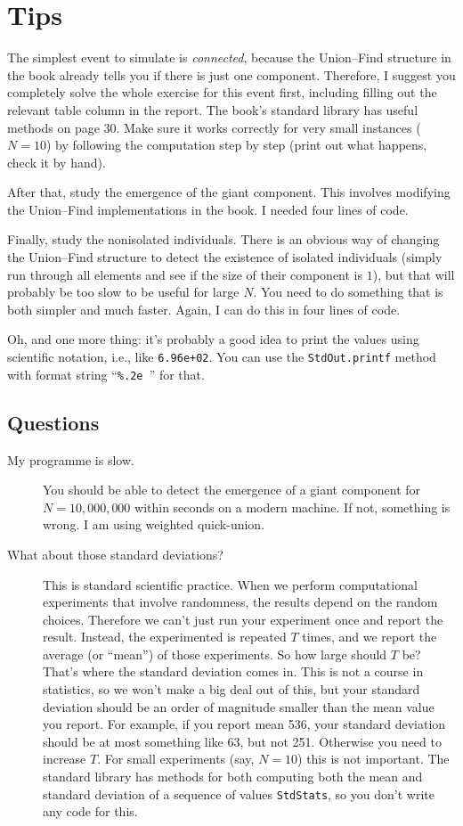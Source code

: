 \documentclass{tufte-handout}
\begin{document}
\section{Tips}

The simplest event to simulate is \emph{connected}, because
the Union--Find structure in the book already tells you if there is
just one component.
Therefore, I suggest you completely solve the whole exercise for this
event first, including filling out the relevant table column in the report.
The book's standard library has useful methods on page 30.
Make sure it works correctly for very small instances ($N=10$) by
following the computation step by step (print out what happens, check
it by hand).

After that, study the emergence of the giant component.
This involves modifying the Union--Find implementations in the book.
I needed four lines of code.

Finally, study the nonisolated individuals.
There is an obvious way of changing the Union--Find structure to detect
the existence of isolated individuals (simply run through all elements
and see if the size of their component is $1$), but that will probably
be too slow to be useful for large $N$.
You need to do something that is both simpler and much faster.
Again, I can do this in four lines of code.

Oh, and one more thing: it's probably a good idea to print the values
using scientific notation, i.e., like {\tt 6.96e+02}.
You can use the {\tt StdOut.printf} method with format string
``{\tt \%.2e }''  for that.

\subsection{Questions}
\begin{description}
\item[My programme is slow.] You should be able to detect the emergence
  of a giant component for $N=10,000,000$ within seconds on a modern
  machine.
  If not, something is wrong.
  I am using weighted quick-union.
\item[What about those standard deviations?]
	This is standard scientific practice.
  When we perform computational experiments that involve randomness,
  the results depend on the random choices.
  Therefore we can't just run your experiment once and report the result.
  Instead, the experimented is repeated $T$ times, and we report the average
  (or ``mean'') of those experiments.
  So how large should $T$ be?
  That's where the standard deviation comes in.
  This is not a course in statistics, so we won't make a big deal out
  of this, but your standard deviation should be an order of magnitude
  smaller than the mean value you report.
  For example, if you report mean 536, your standard deviation should
  be at most something like 63, but not 251.
  Otherwise you need to increase $T$.
  For small experiments (say, $N=10$) this is not important.
  The standard library has methods for both computing both the mean and standard
  deviation of a sequence of values {\tt StdStats}, so you don't write any code for this.
\end{description}
\end{document}
